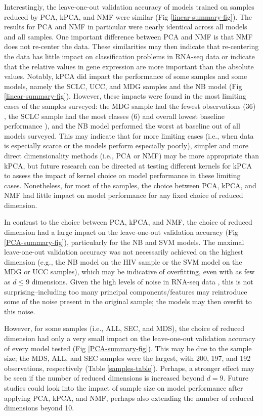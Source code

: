 \documentclass{article}
\begin{document}
Interestingly, the leave-one-out validation accuracy of models trained on samples reduced by PCA, kPCA, and NMF were similar (Fig \ref{linear-summary-fig}). The results for PCA and NMF in particular were nearly identical across all models and all samples. One important difference between PCA and NMF is that NMF does not re-center the data. These similarities may then indicate that re-centering the data has little impact on classification problems in RNA-seq data or indicate that the relative values in gene expression are more important than the absolute values. Notably, kPCA did impact the performance of some samples and some models, namely the SCLC, UCC, and MDG samples and the NB model (Fig \ref{linear-summary-fig}). However, these impacts were found in the most limiting cases of the samples surveyed: the MDG sample had the fewest observations (36) \cite{MDG_paper}, the SCLC sample had the most classes (6) and overall lowest baseline performance \cite{SCLC_paper}), and the NB model performed the worst at baseline out of all models surveyed. This may indicate that for more limiting cases (i.e., when data is especially scarce or the models perform especially poorly), simpler and more direct dimensionality methods (i.e., PCA or NMF) may be more appropriate than kPCA, but future research can be directed at testing different kernels for kPCA to assess the impact of kernel choice on model performance in these limiting cases. Nonetheless, for most of the samples, the choice between PCA, kPCA, and NMF had little impact on model performance for any fixed choice of reduced dimension.

In contrast to the choice between PCA, kPCA, and NMF, the choice of reduced dimension had a large impact on the leave-one-out validation accuracy (Fig \ref{PCA-summary-fig}), particularly for the NB and SVM models. The maximal leave-one-out validation accuracy was not necessarily achieved on the highest dimension (e.g., the NB model on the HIV sample or the SVM model on the MDG or UCC samples), which may be indicative of overfitting, even with as few as $d\leq9$ dimensions. Given the high levels of noise in RNA-seq data \cite{NoisePaper}, this is not surprising\---including too many principal components/features may reintroduce some of the noise present in the original sample; the models may then overfit to this noise.

However, for some samples (i.e., ALL, SEC, and MDS), the choice of reduced dimension had only a very small impact on the leave-one-out validation accuracy of every model tested (Fig \ref{PCA-summary-fig}). This may be due to the sample size; the MDS, ALL, and SEC samples were the largest, with 200, 197, and 192 observations, respectively (Table \ref{samples-table}). Perhaps, a stronger effect may be seen if the number of reduced dimensions is increased beyond $d=9$. Future studies could look into the impact of sample size on model performance after applying PCA, kPCA, and NMF, perhaps also extending the number of reduced dimensions beyond 10.
\end{document}
